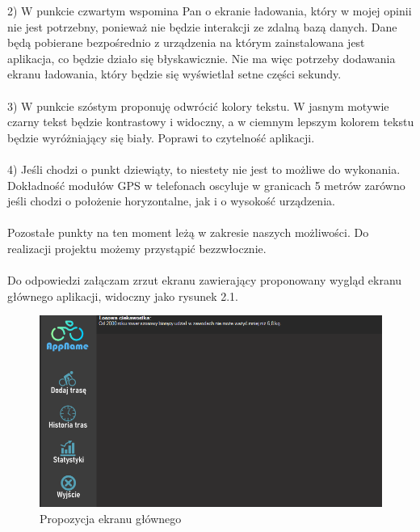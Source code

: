 {2) W punkcie czwartym wspomina Pan o ekranie ładowania, który w mojej opinii nie jest potrzebny, ponieważ nie będzie interakcji ze zdalną bazą danych. Dane będą pobierane bezpośrednio z urządzenia na którym zainstalowana jest aplikacja, co będzie działo się błyskawicznie. Nie ma więc potrzeby dodawania ekranu ładowania, który będzie się wyświetlał setne części sekundy. \\\\
3) W punkcie szóstym proponuję odwrócić kolory tekstu. W jasnym motywie czarny tekst będzie kontrastowy i widoczny, a w ciemnym lepszym kolorem tekstu będzie wyróżniający się biały. Poprawi to czytelność aplikacji. \\\\
4) Jeśli chodzi o punkt dziewiąty, to niestety nie jest to możliwe do wykonania. Dokładność modułów GPS w telefonach oscyluje w granicach 5 metrów zarówno jeśli chodzi o położenie horyzontalne, jak i o wysokość urządzenia. \\\\
Pozostałe punkty na ten moment leżą w zakresie naszych możliwości. Do realizacji projektu możemy przystąpić bezzwłocznie. \\\\
Do odpowiedzi załączam zrzut ekranu zawierający proponowany wygląd ekranu głównego aplikacji, widoczny jako rysunek 2.1.\\
}


	\begin{figure}[!htb]
	\begin{center}
		\includegraphics[width=15cm]{rys/main_screen.png}
		\caption{Propozycja ekranu głównego}
		\label{rys:Propozycja ekranu głównego}
	\end{center}
\end{figure}


